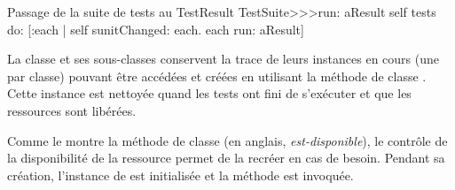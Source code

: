 \documentclass[a4paper,10pt,twoside]{book}
\begin{document}
{%
\begin{method}[testsuiterun:]{Passage de la suite de tests au TestResult}
TestSuite>>>run: aResult
	self tests do:
			[:each |
			self sunitChanged: each.
			each run: aResult]
\end{method}
La classe  et ses sous-classes conservent la trace de leurs instances en cours (une par classe) pouvant être accédées et créées en utilisant la méthode de classe . Cette instance est nettoyée quand les tests ont fini de s'exécuter et que les ressources sont libérées.

Comme le montre la méthode de classe  (en anglais, \emph{est-disponible}), le contrôle de la disponibilité de la ressource permet de la recréer en cas de besoin. 
Pendant sa création, l'instance de  est initialisée et la méthode  est invoquée.


}
\end{document}
